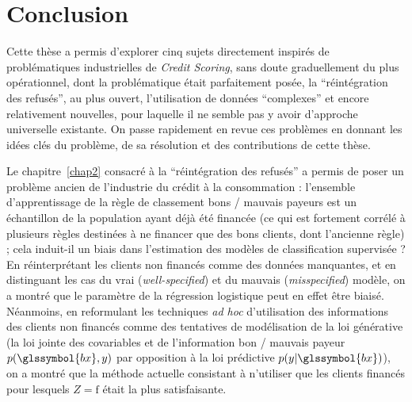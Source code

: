 \chapter*{Conclusion} \label{ccl}


Cette thèse a permis d'explorer cinq sujets directement inspirés de problématiques industrielles de \textit{Credit Scoring}, sans doute graduellement du plus opérationnel, dont la problématique était parfaitement posée, la ``réintégration des refusés'', au plus ouvert, l'utilisation de données ``complexes'' et encore relativement nouvelles, pour laquelle il ne semble pas y avoir d'approche universelle existante. On passe rapidement en revue ces problèmes en donnant les idées clés du problème, de sa résolution et des contributions de cette thèse.

\medskip

Le chapitre~\ref{chap2} consacré à la ``réintégration des refusés'' a permis de poser un problème ancien de l'industrie du crédit à la consommation : l'ensemble d'apprentissage de la règle de classement bons / mauvais payeurs est un échantillon de la population ayant déjà été financée (ce qui est fortement corrélé à plusieurs règles destinées à ne financer que des bons clients, dont l'ancienne règle) ; cela induit-il un biais dans l'estimation des modèles de classification supervisée ? En réinterprétant les clients non financés comme des données manquantes, et en distinguant les cas du vrai (\textit{well-specified}) et du mauvais (\textit{misspecified}) modèle, on a montré que le paramètre de la régression logistique peut en effet être biaisé. Néanmoins, en reformulant les techniques \textit{ad hoc} d'utilisation des informations des clients non financés comme des tentatives de modélisation de la loi générative (la loi jointe des covariables et de l'information bon / mauvais payeur $p(\glssymbol{bx},y)$ par opposition à la loi prédictive $p(y | \glssymbol{bx})$), on a montré que la méthode actuelle consistant à n'utiliser que les clients financés pour lesquels $Z = \text{f}$ était la plus satisfaisante.

\medskip

